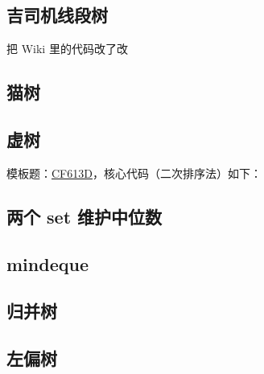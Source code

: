 \documentclass[12pt]{article}
\begin{document}
\newpage

\subsection{吉司机线段树}

把 Wiki 里的代码改了改



\newpage

\subsection{猫树}



\newpage

\subsection{虚树}

模板题：\href{https://codeforces.com/problemset/problem/613/D}{CF613D}，核心代码（二次排序法）如下：



\newpage

\subsection{两个 set 维护中位数}



\newpage

\subsection{mindeque}



\newpage

\subsection{归并树}



\newpage

\subsection{左偏树}
\end{document}
